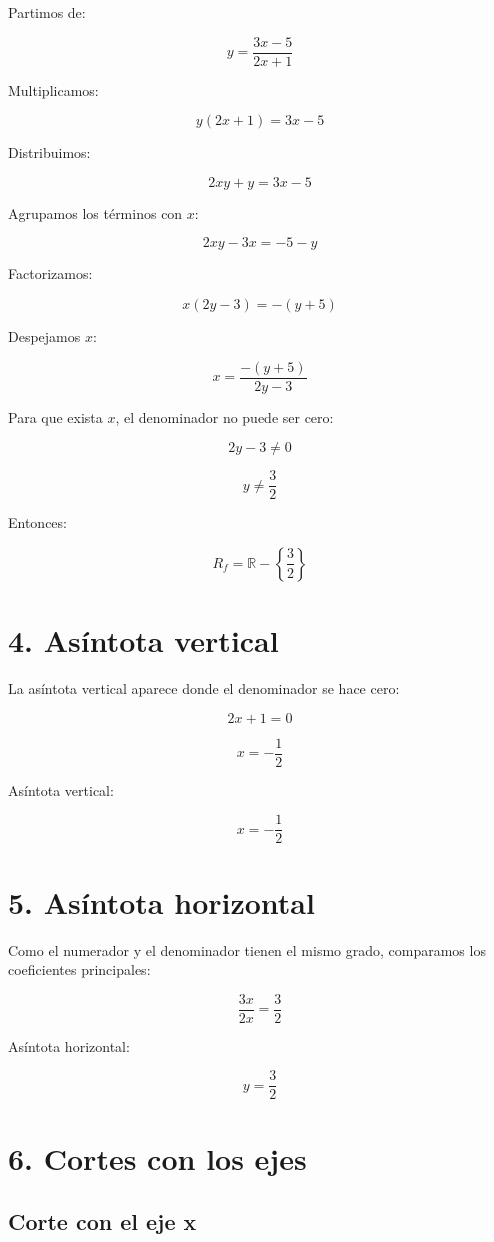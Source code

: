 \documentclass[12pt,a4paper]{article}
\begin{document}
	Partimos de:
	
	\[
	y=\frac{3x-5}{2x+1}
	\]
	
	Multiplicamos:
	
	\[
	y(2x+1)=3x-5
	\]
	
	Distribuimos:
	
	\[
	2xy+y=3x-5
	\]
	
	Agrupamos los términos con $x$:
	
	\[
	2xy-3x=-5-y
	\]
	
	Factorizamos:
	
	\[
	x(2y-3)=-(y+5)
	\]
	
	Despejamos $x$:
	
	\[
	x=\frac{-(y+5)}{2y-3}
	\]
	
	Para que exista $x$, el denominador no puede ser cero:
	
	\[
	2y-3\neq 0
	\]
	
	\[
	y\neq \frac{3}{2}
	\]
	
	Entonces:
	
	\[
	R_f=\mathbb{R}-\left\{\frac{3}{2}\right\}
	\]
	
	\section*{4. Asíntota vertical}
	
	La asíntota vertical aparece donde el denominador se hace cero:
	
	\[
	2x+1=0
	\]
	
	\[
	x=-\frac{1}{2}
	\]
	
	Asíntota vertical:
	
	\[
	x=-\frac{1}{2}
	\]
	
	\section*{5. Asíntota horizontal}
	
	Como el numerador y el denominador tienen el mismo grado, comparamos los coeficientes principales:
	
	\[
	\frac{3x}{2x}=\frac{3}{2}
	\]
	
	Asíntota horizontal:
	
	\[
	y=\frac{3}{2}
	\]
	
	\section*{6. Cortes con los ejes}
	
	\subsection*{Corte con el eje x}
	
\end{document}
